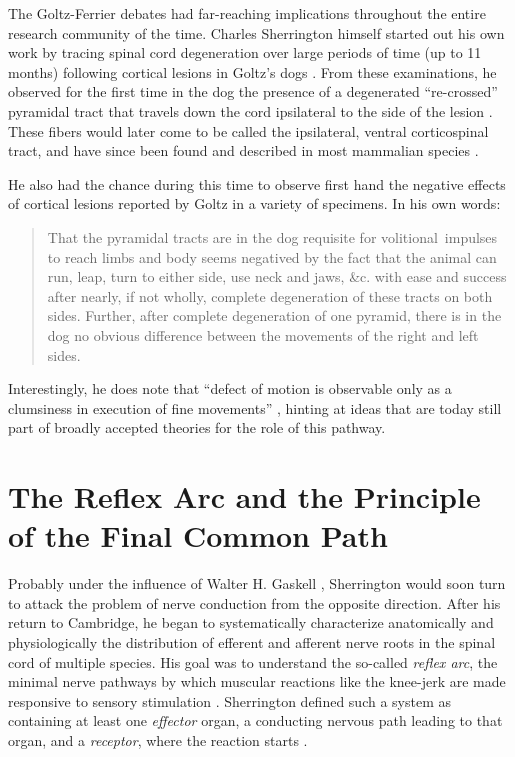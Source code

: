 The Goltz-Ferrier debates had far-reaching implications throughout the entire research community of the time. Charles Sherrington himself started out his own work by tracing spinal cord degeneration over large periods of time (up to 11 months) following cortical lesions in Goltz's dogs \cite{Langley1884,Sherrington1885}. From these examinations, he observed for the first time in the dog the presence of a degenerated ``re-crossed'' pyramidal tract that travels down the cord ipsilateral to the side of the lesion \cite{Sherrington1885}. These fibers would later come to be called the ipsilateral, ventral corticospinal tract, and have since been found and described in most mammalian species \cite{Kuypers1981,Brosamle2000,Lacroix2004}.

He also had the chance during this time to observe first hand the negative effects of cortical lesions reported by Goltz in a variety of specimens. In his own words:

\blockquote[{\protect\cite[p.189]{Sherrington1885}}]{That the pyramidal tracts are in the dog requisite for volitional~impulses to reach limbs and body seems negatived by the fact that the animal can run, leap, turn to either side, use neck and jaws, \&c. with ease and success after nearly, if not wholly, complete degeneration of these tracts on both sides. Further, after complete degeneration of one pyramid, there is in the dog no obvious difference between the movements of the right and left sides.}

Interestingly, he does note that \enquote{defect of motion is observable only as a clumsiness in execution of fine movements} \cite{Sherrington1885}, hinting at ideas that are today still part of broadly accepted theories for the role of this pathway.

\section{The Reflex Arc and the Principle of the Final Common Path}

Probably under the influence of Walter H. Gaskell \cite{Molnar2010}, Sherrington would soon turn to attack the problem of nerve conduction from the opposite direction. After his return to Cambridge, he began to systematically characterize anatomically and physiologically the distribution of efferent \cite{Sherrington1892} and afferent \cite{Sherrington1893a} nerve roots in the spinal cord of multiple species. His goal was to understand the so-called \emph{reflex arc}, the minimal nerve pathways by which muscular reactions like the knee-jerk are made responsive to sensory stimulation \cite{Sherrington1893b}. Sherrington defined such a system as containing at least one \emph{effector} organ, a conducting nervous path leading to that organ, and a \emph{receptor}, where the reaction starts \cite{Sherrington1906}.

